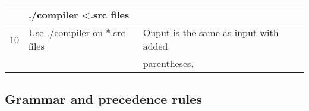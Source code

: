 \documentclass{article}
\begin{document}
\begin{tabular}{| l | l | l | c |}
	\hline 	  
	\hline
	& \multicolumn{2}{l}{./compiler \textless *.src files} & \\
	\hline
	10 & Use ./compiler on *.src files & Ouput is the same as input with added  &  \ding{51} \\ 
	   & & parentheses. & \\
	\hline
\end{tabular}



\newpage
\appendix

\subsection*{Grammar and precedence rules}
\end{document}
